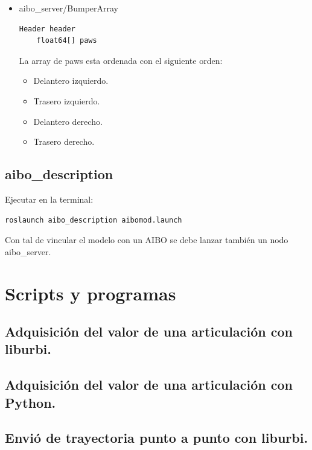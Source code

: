 \documentclass[12pt,a4paper,final,twoside]{book}
\begin{document}
\begin{itemize}
\begin{itemize}
\end{itemize}
\item aibo{\_}server/BumperArray
\begin{lstlisting}[language=bash]
	Header header
	float64[] paws
\end{lstlisting}

La array de paws esta ordenada con el siguiente orden:
\begin{itemize}
\item Delantero izquierdo.
\item Trasero izquierdo.
\item Delantero derecho.
\item Trasero derecho.
\end{itemize}
\end{itemize}

\subsection{aibo{\_}description}
Ejecutar en la terminal:
\begin{lstlisting}[language=bash]
	roslaunch aibo_description aibomod.launch
\end{lstlisting}


Con tal de vincular el modelo con un AIBO se debe lanzar también un nodo aibo{\_}server.

\newpage

\section{Scripts y programas}
\subsection{Adquisición del valor de una articulación con liburbi.}
\label{getDataOneLegC++}


\subsection{Adquisición del valor de una articulación con Python.}
\label{getDataOneLegPy}


\subsection{Envió de trayectoria punto a punto con liburbi.}\label{sinC}

\end{document}
